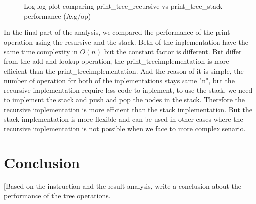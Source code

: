 \documentclass[a4paper,11pt]{article}
\begin{document}
\begin{figure}[h]
    \centering
    \caption{Log-log plot comparing print\_tree\_recursive vs print\_tree\_stack performance (Avg/op)}
    \label{fig:print_operations_comparison}
\end{figure}
In the final part of the analysis, we compared the performance of the print operation using the resursive and the stack. Both of the inplementation have the same time complexity in $O(n)$ but the constant factor is different.
But differ from the add and lookup operation, the print\_tree\recursive implementation is more efficient than the print\_tree\stack implementation. And the reason of it is simple, the number of operation for both of the inplementations stays same "n", but the recursive implementation require less code to inplement, to use the stack, we need to implement the stack and push and pop the nodes in the stack. Therefore the recursive implementation is more efficient than the stack implementation. But the stack implementation is more flexible and can be used in other cases where the recursive implementation is not possible when we face to more complex senario. 


\section*{Conclusion}
[Based on the instruction and the result analysis, write a conclusion about the performance of the tree operations.]
\end{document}
